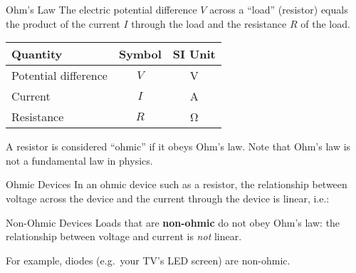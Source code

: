 \documentclass[12pt,aspectratio=169]{beamer}
\begin{document}
\begin{frame}{Ohm's Law}
  The electric potential difference $V$ across a ``load'' (resistor) equals the
  product of the current $I$ through the load and the resistance $R$ of the
  load.

  \begin{center}
    \begin{tabular}{l|c|c}
      \rowcolor{pink}
      \textbf{Quantity} & \textbf{Symbol} & \textbf{SI Unit} \\ \hline
      Potential difference & $V$    & \si\volt \\
      Current              & $I$    & \si\ampere \\
      Resistance           & $R$    & \si\ohm
    \end{tabular}
  \end{center}
  A resistor is considered ``ohmic'' if it obeys Ohm's law. Note that Ohm's law
  is not a fundamental law in physics.
\end{frame}



\begin{frame}{Ohmic Devices}
  In an ohmic device such as a resistor, the relationship between voltage
  across the device and the current through the device is linear, i.e.:
  \begin{center}
    \hspace{.15in}
  \end{center}
\end{frame}



\begin{frame}{Non-Ohmic Devices}
  Loads that are \textbf{non-ohmic} do not obey Ohm's law: the relationship
  between voltage and current is \emph{not} linear.
  \begin{center}
  \end{center}
  For example, diodes (e.g.\ your TV's LED screen) are non-ohmic.
\end{frame}
\end{document}
